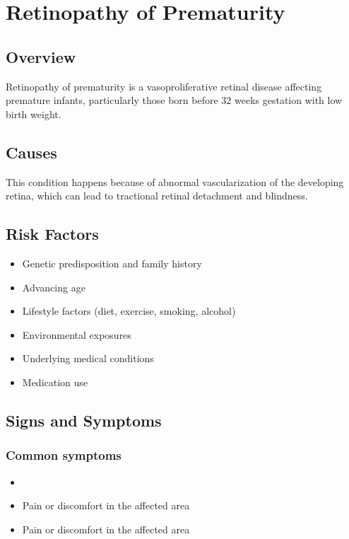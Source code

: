 \chapter{Retinopathy of Prematurity}
\label{sec:Retinopathy of Prematurity}

\section{Overview}
Retinopathy of prematurity is a vasoproliferative retinal disease affecting premature infants, particularly those born before 32 weeks gestation with low birth weight.
\section{Causes}
This condition happens because of abnormal vascularization of the developing retina, which can lead to tractional retinal detachment and blindness.     
\section{Risk Factors}

\begin{itemize}[noitemsep]
  \item Genetic predisposition and family history
  \item Advancing age
  \item Lifestyle factors (diet, exercise, smoking, alcohol)
  \item Environmental exposures
  \item Underlying medical conditions
  \item Medication use
\end{itemize}
\section{Signs and Symptoms}

\subsection{Common symptoms}
\begin{itemize}[noitemsep]
  \item \item Pain or discomfort in the affected area    \item Pain or discomfort in the affected area
  \end{itemize}

